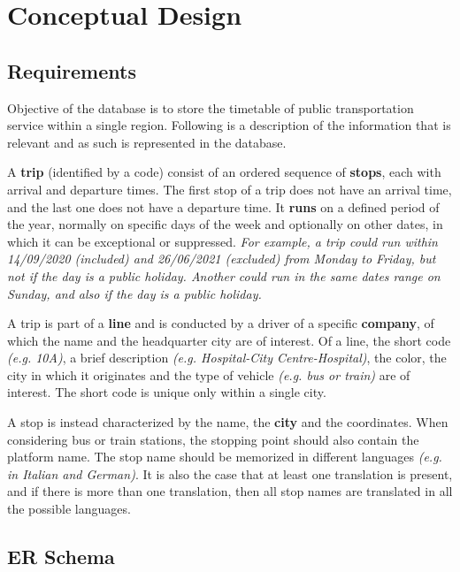 \section{Conceptual Design}

\subsection{Requirements}

	Objective of the database is to store the timetable of public transportation service within a single region. Following is a description of the information that is relevant and as such is represented in the database. \medskip
	
	A \textbf{trip} (identified by a code) consist of an ordered sequence of \textbf{stops}, each with arrival and departure times. The first stop of a trip does not have an arrival time, and the last one does not have a departure time. It \textbf{runs} on a defined period of the year, normally on specific days of the week and optionally on other dates, in which it can be exceptional or suppressed. \textit{For example, a trip could run within 14/09/2020 (included) and 26/06/2021 (excluded) from Monday to Friday, but not if the day is a public holiday. Another could run in the same dates range on Sunday, and also if the day is a public holiday.}
	
	A trip is part of a \textbf{line} and is conducted by a driver of a specific \textbf{company}, of which the name and the headquarter city are of interest. Of a line, the short code \textit{(e.g. 10A)}, a brief description \textit{(e.g. Hospital-City Centre-Hospital)}, the color, the city in which it originates and the type of vehicle \textit{(e.g. bus or train)} are of interest. The short code is unique only within a single city.
	
	A stop is instead characterized by the name, the \textbf{city} and the coordinates. When considering bus or train stations, the stopping point should also contain the platform name. The stop name should be memorized in different languages \textit{(e.g. in Italian and German)}. It is also the case that at least one translation is present, and if there is more than one translation, then all stop names are translated in all the possible languages.

\subsection{ER Schema}

